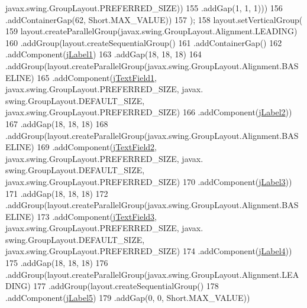 \begin{DoxyCode}
      javax.swing.GroupLayout.PREFERRED\_SIZE))
155                         .addGap(1, 1, 1)))
156                 .addContainerGap(62, Short.MAX\_VALUE))
157         );
158         layout.setVerticalGroup(
159             layout.createParallelGroup(javax.swing.GroupLayout.Alignment.LEADING)
160             .addGroup(layout.createSequentialGroup()
161                 .addContainerGap()
162                 .addComponent(\mbox{\hyperlink{class_interfaz_package_1_1_alta_diccionario_af8a39de35277501b7801eaf2c5ccbf33}{jLabel1}})
163                 .addGap(18, 18, 18)
164                 .addGroup(layout.createParallelGroup(javax.swing.GroupLayout.Alignment.BASELINE)
165                     .addComponent(\mbox{\hyperlink{class_interfaz_package_1_1_alta_diccionario_a36c60a7c341675a6d9588408d4babd4c}{jTextField1}}, javax.swing.GroupLayout.PREFERRED\_SIZE, javax.
      swing.GroupLayout.DEFAULT\_SIZE, javax.swing.GroupLayout.PREFERRED\_SIZE)
166                     .addComponent(\mbox{\hyperlink{class_interfaz_package_1_1_alta_diccionario_ab2913168b8ce8c2e33af1a06a91424a1}{jLabel2}}))
167                 .addGap(18, 18, 18)
168                 .addGroup(layout.createParallelGroup(javax.swing.GroupLayout.Alignment.BASELINE)
169                     .addComponent(\mbox{\hyperlink{class_interfaz_package_1_1_alta_diccionario_ad64c1145064a7b09a9bc29cf43974b70}{jTextField2}}, javax.swing.GroupLayout.PREFERRED\_SIZE, javax.
      swing.GroupLayout.DEFAULT\_SIZE, javax.swing.GroupLayout.PREFERRED\_SIZE)
170                     .addComponent(\mbox{\hyperlink{class_interfaz_package_1_1_alta_diccionario_a4acae592782e66c775de54bfe425ea0d}{jLabel3}}))
171                 .addGap(18, 18, 18)
172                 .addGroup(layout.createParallelGroup(javax.swing.GroupLayout.Alignment.BASELINE)
173                     .addComponent(\mbox{\hyperlink{class_interfaz_package_1_1_alta_diccionario_aae93f196d81a8be5120cd2e4a3968176}{jTextField3}}, javax.swing.GroupLayout.PREFERRED\_SIZE, javax.
      swing.GroupLayout.DEFAULT\_SIZE, javax.swing.GroupLayout.PREFERRED\_SIZE)
174                     .addComponent(\mbox{\hyperlink{class_interfaz_package_1_1_alta_diccionario_ace70621c67ef90297d4ff752d97c97c4}{jLabel4}}))
175                 .addGap(18, 18, 18)
176                 .addGroup(layout.createParallelGroup(javax.swing.GroupLayout.Alignment.LEADING)
177                     .addGroup(layout.createSequentialGroup()
178                         .addComponent(\mbox{\hyperlink{class_interfaz_package_1_1_alta_diccionario_af33a0210b14d80015c323d59ca84e134}{jLabel5}})
179                         .addGap(0, 0, Short.MAX\_VALUE))

\end{DoxyCode}
